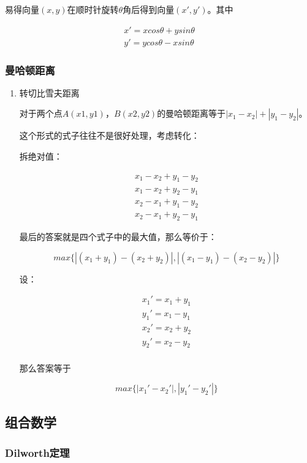 \documentclass[11pt]{article}
\begin{document}
易得向量\((x,y)\)在顺时针旋转\(\theta\)角后得到向量\((x',y')\)。其中

$$
\begin{aligned}
x'=xcos \theta+ysin\theta \\
y'=ycos \theta-xsin\theta
\end{aligned}
$$

\subsubsection{曼哈顿距离}
\label{sec-1-3-2}
\begin{enumerate}
\item 转切比雪夫距离
\label{sec-1-3-2-1}

对于两个点\(A(x1,y1)\)，\(B(x2,y2)\)的曼哈顿距离等于\(|x_1-x_2|+|y_1-y_2|\)。  

这个形式的式子往往不是很好处理，考虑转化：

拆绝对值：

$$
\begin{aligned}
x_1-x_2+y_1-y_2 \\
x_1-x_2+y_2-y_1 \\
x_2-x_1+y_1-y_2 \\
x_2-x_1+y_2-y_1
\end{aligned}
$$

最后的答案就是四个式子中的最大值，那么等价于：

$$
max\{|(x_1+y_1)-(x_2+y_2)|,|(x_1-y_1)-(x_2-y_2)|\}
$$

设：

$$
\begin{aligned}
x_1'=x_1+y_1 \\
y_1'=x_1-y_1 \\
x_2'=x_2+y_2 \\
y_2'=x_2-y_2 \\
\end{aligned}
$$


那么答案等于

$$
max\{|x_1'-x_2'|,|y_1'-y_2'|\}
$$
\end{enumerate}

\subsection{组合数学}
\label{sec-1-4}
\subsubsection{Dilworth定理}
\label{sec-1-4-1}
\end{document}

